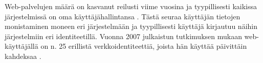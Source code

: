 Web-palvelujen määrä on kasvanut reilusti viime vuosina ja tyypillisesti kaikissa järjestelmissä on oma käyttäjähallintansa \cite{billion_keys}. Tästä seuraa käyttäjän tietojen monistaminen moneen eri järjestelmään ja tyypillisesti käyttäjä kirjautuu näihin järjestelmiin eri identiteetillä. Vuonna 2007 julkaistun tutkimuksen mukaan web-käyttäjällä on n. 25 erillistä verkkoidentiteettiä, joista hän käyttää päivittäin kahdeksaa \cite{password_habits}.

